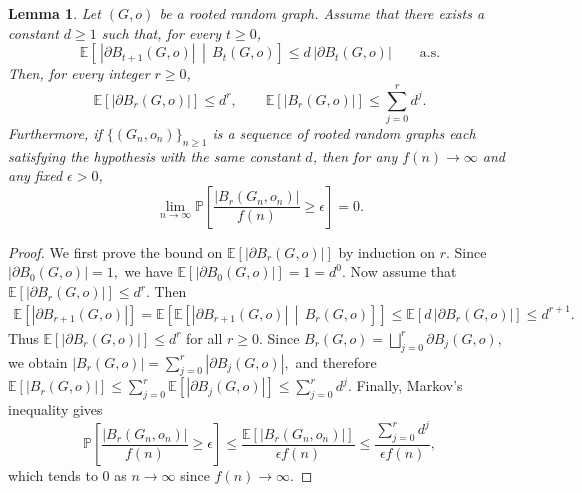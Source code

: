 \documentclass[10pt]{amsart}
\newtheorem{lemma}[theorem]{Lemma}
\begin{document}
\begin{lemma} \label{prelim-4}
Let $(G,o)$ be a rooted random graph. Assume that there exists a constant $d\ge 1$ such that, for every $t\ge 0$,
\[
\mathbb E\!\left[\,|\partial B_{t+1}(G,o)| \,\middle|\, B_t(G,o)\right]
\le d\,|\partial B_t(G,o)| \qquad \text{a.s.}
\]
Then, for every integer $r\ge 0$,
\[
\mathbb E[|\partial B_r(G,o)|]\le d^r,
\qquad
\mathbb E[|B_r(G,o)|]\le \sum_{j=0}^r d^j.
\]
 Furthermore, if $\{(G_n,o_n)\}_{n\ge 1}$ is a sequence of rooted random
  graphs each satisfying the hypothesis with the same constant $d$, then
  for any $f(n)\to\infty$ and any fixed $\epsilon>0$,
  \[
  \lim_{n\to\infty}
  \mathbb P\!\left[\frac{|B_r(G_n,o_n)|}{f(n)}\ge \epsilon\right]=0.
  \]
\end{lemma}

\begin{proof}
We first prove the bound on $\mathbb E[|\partial B_r(G,o)|]$ by induction on $r$. Since
\(
|\partial B_0(G,o)|=1,
\)
we have $\mathbb E[|\partial B_0(G,o)|]=1=d^0$. Now assume that
\(
\mathbb E[|\partial B_r(G,o)|]\le d^r.
\)
Then
\begin{align*}
\mathbb E[|\partial B_{r+1}(G,o)|]
=
\mathbb E\!\left[\mathbb E\!\left[|\partial B_{r+1}(G,o)|\,\middle|\, B_r(G,o)\right]\right] \le
\mathbb E\!\left[d\,|\partial B_r(G,o)|\right]
\le d^{r+1}.
\end{align*}
Thus $\mathbb E[|\partial B_r(G,o)|]\le d^r$ for all $r\ge 0$. Since
\(
B_r(G,o)=\bigsqcup_{j=0}^r \partial B_j(G,o),
\)
we obtain
\(
|B_r(G,o)|=\sum_{j=0}^r |\partial B_j(G,o)|,
\)
and therefore
\(
\mathbb E[|B_r(G,o)|]
\le \sum_{j=0}^r \mathbb E[|\partial B_j(G,o)|]
\le \sum_{j=0}^r d^j.
\) Finally, Markov's inequality gives
\[
\mathbb P\!\left[\frac{|B_r(G_n,o_n)|}{f(n)}\ge \epsilon\right]
\le
\frac{\mathbb E[|B_r(G_n,o_n)|]}{\epsilon f(n)}
\le
\frac{\sum_{j=0}^r d^j}{\epsilon f(n)},
\]
which tends to $0$ as $n\to\infty$ since $f(n)\to\infty$.
\end{proof}
\end{document}
